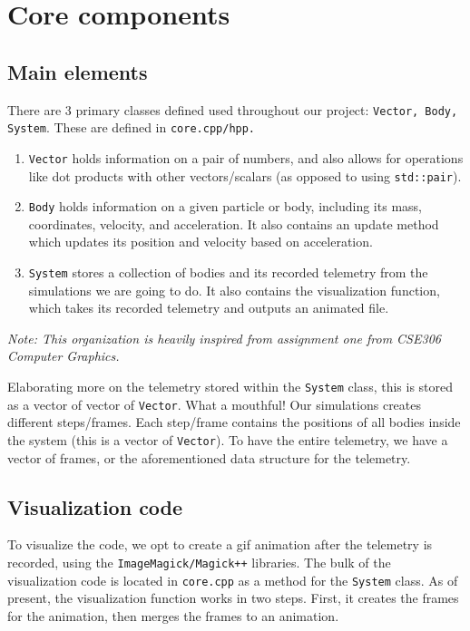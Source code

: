 \documentclass{article}
\begin{document}
\section{Core components}

\subsection{Main elements}

There are 3 primary classes defined used throughout our project: \texttt{Vector, Body, System}. These are defined in \texttt{core.cpp/hpp.}
\begin{enumerate}
    \item \texttt{Vector} holds information on a pair of numbers, and also allows for operations like dot products with other vectors/scalars (as opposed to using \texttt{std::pair}).
    \item \texttt{Body} holds information on a given particle or body, including its mass, coordinates, velocity, and acceleration. It also contains an update method which updates its position and velocity based on acceleration. 
    \item \texttt{System} stores a collection of bodies and its recorded telemetry from the simulations we are going to do. It also contains the visualization function, which takes its recorded telemetry and outputs an animated file.
\end{enumerate} 
\textit{Note: This organization is heavily inspired from assignment one from CSE306 Computer Graphics.}

Elaborating more on the telemetry stored within the \texttt{System} class, this is stored as a vector of vector of \texttt{Vector}. What a mouthful! Our simulations creates different steps/frames. Each step/frame contains the positions of all bodies inside the system (this is a vector of \texttt{Vector}). To have the entire telemetry, we have a vector of frames, or the aforementioned data structure for the telemetry.

\subsection{Visualization code}

To visualize the code, we opt to create a gif animation after the telemetry is recorded, using the \texttt{ImageMagick/Magick++} libraries. The bulk of the visualization code is located in \texttt{core.cpp} as a method for the \texttt{System} class. As of present, the visualization function works in two steps. First, it creates the frames for the animation, then merges the frames to an animation. 
\end{document}
